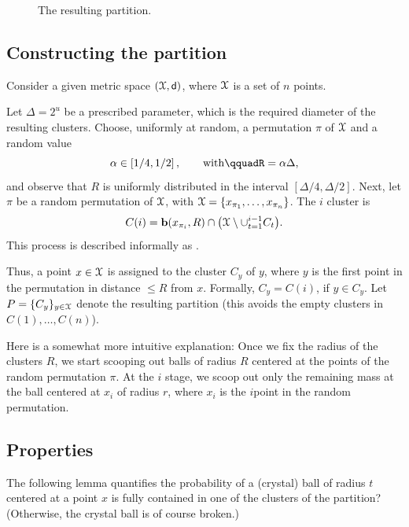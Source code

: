 \begin{figure}[t]
    \centerline{%
    }%
    \caption{The resulting partition.}
\end{figure}


\subsection{Constructing the partition}

Consider a given metric space $(\FMS, \DistChar)$, where $\FMS$ is a
set of $n$ points.

Let $\Delta = 2^u$ be a prescribed parameter, which is the required
diameter of the resulting clusters.  Choose, uniformly at random, a
permutation $\pi$ of $\FMS$ and a random value
\[
    \alpha \in \pbrcS{\nfrac{1}{4},\nfrac{1}{2}},%
    \qquad\text{with}\qquad%
    R = \alpha \Delta,
\]
and observe that $R$ is uniformly distributed in the interval
$[\Delta/4, \Delta/2]$. Next, let $\pi$ be a random permutation of
$\FMS$, with  $\FMS = \{ x_{\pi_1}, \ldots, x_{\pi_n} \}$. The $i$\th
cluster is
\begin{equation*}
    C(i)
    =%
    \Ball(x_{\pi_i}, R) \cap \bigl(\FMS \setminus \cup_{t=1}^{i-1} C_t \bigr).
\end{equation*}
This process is described informally as .

Thus, a point $x\in \FMS$ is assigned to the cluster $C_y$ of $y$, where
$y$ is the first point in the permutation in distance $\leq R$ from
$x$. Formally, $C_y = C(i)$, if $y \in C_y$.  Let
$P = \{C_y\}_{y \in \FMS}$ denote the resulting partition (this avoids
the empty clusters in $C(1), \ldots, C(n)$).

Here is a somewhat more intuitive explanation: Once we fix the radius
of the clusters $R$, we start scooping out balls of radius $R$
centered at the points of the random permutation $\pi$. At the $i$\th
stage, we scoop out only the remaining mass at the ball centered at
$x_i$ of radius $r$, where $x_i$ is the $i$\th point in the random
permutation.


\subsection{Properties}

The following lemma quantifies the probability of a (crystal) ball of
radius $t$ centered at a point $x$ is fully contained in one of the
clusters of the partition? (Otherwise, the crystal ball is of course
broken.)

